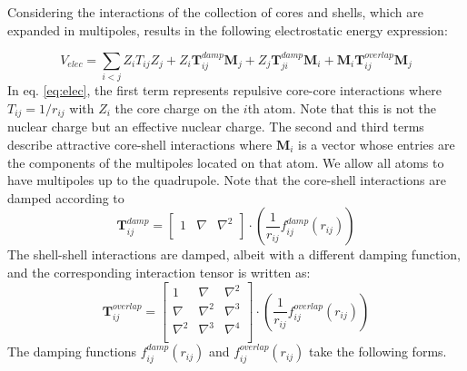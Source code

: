 \documentclass[journal=jacsat,manuscript=article]{achemso}
\begin{document}
Considering the interactions of the collection of cores and shells, which are expanded in multipoles,
results in the following electrostatic energy expression:

\begin{equation}
  V_{elec}=\sum_{i<j}Z_iT_{ij}Z_j+Z_i\bm{T}_{ij}^{damp}\bm{M}_j+Z_j\bm{T}_{ji}^{damp}\bm{M}_i+\bm{M}_i\bm{T}_{ij}^{overlap}\bm{M}_j
  \label{eq:elec}
\end{equation}
\noindent
In eq. \ref{eq:elec}, the first term represents repulsive core-core interactions where $T_{ij}=1/r_{ij}$
with $Z_i$ the core charge on the $i$th atom. Note that this is not the nuclear charge but an effective
nuclear charge. The second and third terms describe attractive core-shell interactions where $\bm{M}_i$ is
a vector whose entries are the components of the multipoles located on that atom. We allow all atoms to have
multipoles up to the quadrupole. Note that the core-shell interactions are damped according to
\begin{equation}
  \bm{T}_{ij}^{damp}=
  \begin{bmatrix}
    1 & \nabla & \nabla^2 \\
  \end{bmatrix}\cdot
  \left(\frac{1}{r_{ij}}f_{ij}^{damp}(r_{ij})\right)
  \label{eq:T_damp}
\end{equation}
\noindent
The shell-shell interactions are damped, albeit with a different damping function,
and the corresponding interaction tensor is written as:
\begin{equation}
  \bm{T}_{ij}^{overlap}=
  \begin{bmatrix}
    1 & \nabla & \nabla^2 \\
    \nabla & \nabla^2 & \nabla^3 \\
    \nabla^2 & \nabla^3 & \nabla^4 \\
  \end{bmatrix}\cdot
  \left(\frac{1}{r_{ij}}f_{ij}^{overlap}(r_{ij})\right)
  \label{eq:T_overlap}
\end{equation}
\noindent
The damping functions $f_{ij}^{damp}(r_{ij})$ and $f_{ij}^{overlap}(r_{ij})$ 
take the following forms.
\end{document}
